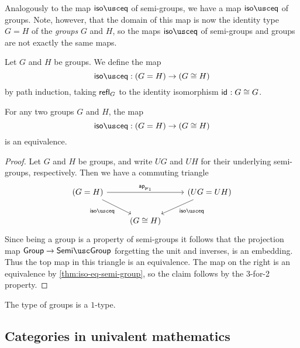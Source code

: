 Analogously to the map $\isoeq$ of semi-groups, we have a map $\isoeq$ of groups. Note, however, that the domain of this map is now the identity type $G=H$ of the \emph{groups} $G$ and $H$, so the maps $\isoeq$ of semi-groups and groups are not exactly the same maps.

\begin{defn}
  Let $G$ and $H$ be groups. We define the map
  \begin{equation*}
    \isoeq : (G=H)\to (G\cong H)
  \end{equation*}
  by path induction, taking $\mathsf{refl}_{G}$ to the identity isomorphism $\mathsf{id}_{}:G\cong G$.
\end{defn}

\begin{thm}
  For any two groups $G$ and $H$, the map
  \begin{equation*}
    \isoeq:(G=H)\to (G\cong H)
  \end{equation*}
  is an equivalence.
\end{thm}

\begin{proof}
  Let $G$ and $H$ be groups, and write $UG$ and $UH$ for their underlying semi-groups, respectively. Then we have a commuting triangle
  \begin{equation*}
    \begin{tikzcd}
      (G=H) \arrow[rr,"\apfunc{\proj 1}"] \arrow[dr,swap,"\isoeq"] & & (UG=UH) \arrow[dl,"\isoeq"] \\
      & (G\cong H)
    \end{tikzcd}
  \end{equation*}
  Since being a group is a property of semi-groups it follows that the projection map $\group\to\semigroup$ forgetting the unit and inverses, is an embedding. Thus the top map in this triangle is an equivalence. The map on the right is an equivalence by \cref{thm:iso-eq-semi-group}, so the claim follows by the 3-for-2 property.
\end{proof}

\begin{cor}
  The type of groups is a $1$-type.
\end{cor}

\subsection{Categories in univalent mathematics}
\label{sec:categories}

